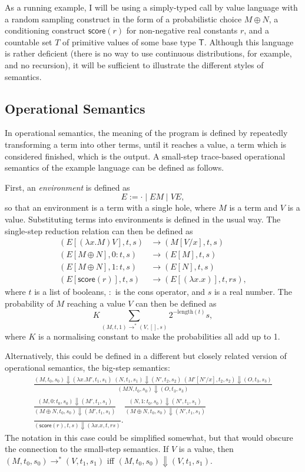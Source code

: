\documentclass[titlepage]{article}
\newcommand{\tscore}{\mathsf{score}}
\begin{document}
As a running example, I will be using a simply-typed call by value language with a random sampling construct in the form of a probabilistic choice $M \oplus N$, a conditioning construct $\tscore(r)$ for non-negative real constants $r$, and a countable set $T$ of primitive values of some base type $\mathsf T$. Although this language is rather deficient (there is no way to use continuous distributions, for example, and no recursion), it will be sufficient to illustrate the different styles of semantics.

\subsection{Operational Semantics} \label{operational semantics}
In operational semantics, the meaning of the program is defined by repeatedly transforming a term into other terms, until it reaches a value, a term which is considered finished, which is the output. A small-step trace-based operational semantics of the example language can be defined as follows.

First, an \emph{environment} is defined as
\begin{equation*}
E := \cdot \mid E M \mid V E,
\end{equation*}
so that an environment is a term with a single hole, where $M$ is a term and $V$ is a value. Substituting terms into environments is defined in the usual way. The single-step reduction relation can then be defined as
\begin{align*}
(E[(\lambda x. M) V], t, s) & \to (M[V/x], t, s) \\
(E[M \oplus N], 0:t, s) & \to (E[M], t, s) \\
(E[M \oplus N], 1:t, s) & \to (E[N], t, s) \\
(E[\tscore(r)], t, s) & \to (E[(\lambda x. x)], t, rs),
\end{align*}
where $t$ is a list of booleans, $:$ is the cons operator, and $s$ is a real number. The probability of $M$ reaching a value $V$ can then be defined as
\[
K \sum_{(M,t,1) \to^* (V,[],s)} 2^{-\mathrm{length}(t)} s,
\]
where $K$ is a normalising constant to make the probabilities all add up to 1.

Alternatively, this could be defined in a different but closely related version of operational semantics, the big-step semantics:
\begin{multline*}
\frac{(M, t_0, s_0) \Downarrow (\lambda x. M', t_1, s_1) \; (N, t_1, s_1) \Downarrow (N', t_2, s_2) \; (M'[N'/x], t_2, s_2) \Downarrow (O, t_3, s_3)}{(M N, t_0, s_0) \Downarrow (O, t_3, s_3)} \\
\frac{(M, 0:t_0, s_0) \Downarrow (M', t_1, s_1)}{(M \oplus N, t_0, s_0) \Downarrow (M', t_1, s_1)} \quad
\frac{(N, 1:t_0, s_0) \Downarrow (N', t_1, s_1)}{(M \oplus N, t_0, s_0) \Downarrow (N', t_1, s_1)} \\
\frac{}{(\tscore(r), t, s) \Downarrow (\lambda x. x, t, rs)}.
\end{multline*}
The notation in this case could be simplified somewhat, but that would obscure the connection to the small-step semantics. If $V$ is a value, then $(M, t_0, s_0) \to^* (V, t_1, s_1)$ iff $(M, t_0, s_0) \Downarrow (V, t_1, s_1)$.
\end{document}

